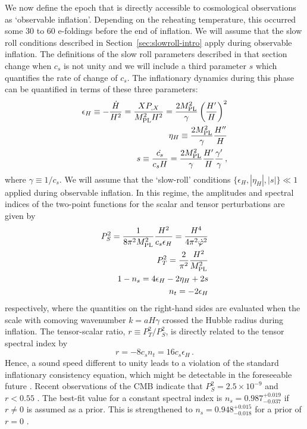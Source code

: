 We now define the epoch that is directly 
accessible to cosmological observations as `observable inflation'. 
Depending on the reheating 
temperature, this occurred some 30 to 60 e-foldings before the end of 
inflation. We will assume that the slow roll conditions described in 
Section~\ref{sec:slowroll-intro} apply during observable inflation.
The definitions of the slow roll parameters described in that section 
change when $c_s$ is not unity and we
will include a third parameter $s$ which quantifies the rate of change of $c_s$.
The inflationary dynamics during this phase can  
be quantified in terms of these three parameters: 
% 
\begin{eqnarray}
\label{eq:epsdefn-dbiintro}
\epsilon_H \equiv -\frac{\dot{H}}{H^2}
= \frac{XP_{,X}}{M_{\mathrm{PL}}^2H^2} 
= \frac{2M_{\mathrm{PL}}^2}{\gamma} \left( \frac{H'}{H} \right)^2 \\
\label{eq:defeta-dbiintro}
\eta_H \equiv  \frac{2M_{\mathrm{PL}}^2}{\gamma}\frac{H''}{H} \\
\label{eq:defs-dbiintro}
s \equiv \frac{\dot{c_s}}{c_sH} 
= \frac{2M_{\mathrm{PL}}^2}{\gamma} \frac{H'}{H}\frac{\gamma'}{\gamma}  \,,
\end{eqnarray}
% 
where $\gamma \equiv 1/c_s$. 
We will assume that the `slow-roll' conditions 
$\{ \epsilon_H, |\eta_H | , |s | \}  \ll 1$ applied during observable inflation. 
In this regime, the amplitudes and spectral indices of the two-point functions 
for the scalar and tensor perturbations are given by \cite{gm}
% 
\begin{eqnarray}
\label{eq:spectra-dbiintro}
P_S^2= \frac{1}{8 \pi^2 M_{\mathrm{PL}}^2} \frac{H^2}{c_s \epsilon_H}
= \frac{H^4}{4\pi^2\dot{\varphi}^2}
\\
P_T^2 = \frac{2}{\pi^2} \frac{H^2}{M_{\mathrm{PL}}^2} 
\\
\label{indices}
1-n_s = 4 \epsilon_H -2\eta_H  +2s 
\\
 n_t = -2\epsilon_H  
\end{eqnarray}
% 
respectively, where the quantities on the right-hand sides are evaluated 
when the scale with comoving wavenumber $k=aH\gamma$ crossed 
the Hubble radius during inflation.  
The tensor-scalar ratio, $r \equiv P_T^2/P_S^2$, is directly related to 
the tensor spectral index by \cite{gm}
% 
\begin{equation}
\label{eq:consistency-dbiintro}
r= -8c_sn_t = 16c_s \epsilon_H\,.
\end{equation}
% 
Hence, a sound speed different to unity leads to a violation of the 
standard inflationary consistency equation, which might be 
detectable in the foreseeable future \cite{lidser1,lidser2}. 
Recent observations of the CMB 
indicate that $P^2_S=2.5 \times 10^{-9}$ and $r < 0.55$ \cite{spergel}. 
The best-fit value for a constant spectral index is 
$n_s = 0.987^{+0.019}_{-0.037}$ if $r\ne 0$ is assumed as a prior. 
This is strengthened to 
$n_s = 0.948^{+0.015}_{-0.018}$ for a prior of $r = 0$ \cite{spergel}. 



